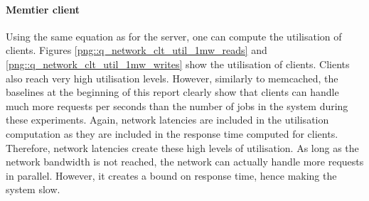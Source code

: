 \documentclass[11pt,a4paper]{article}
\begin{document}
\paragraph{Memtier client}
Using the same equation as for the server, one can compute the utilisation of clients. Figures \ref{png::q_network_clt_util_1mw_reads} and \ref{png::q_network_clt_util_1mw_writes} show the utilisation of clients. Clients also reach very high utilisation levels. However, similarly to memcached, the baselines at the beginning of this report clearly show that clients can handle much more requests per seconds than the number of jobs in the system during these experiments. Again, network latencies are included in the utilisation computation as they are included in the response time computed for clients. Therefore, network latencies create these high levels of utilisation. As long as the network bandwidth is not reached, the network can actually handle more requests in parallel. However, it creates a bound on response time, hence making the system slow.
\end{document}
